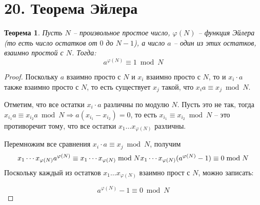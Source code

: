 \documentclass[a4paper,12pt]{article}
\newtheorem*{ther}{Теорема}
\renewcommand{\phi}{\varphi}
\begin{document}
        \section*{20. Теорема Эйлера}
        \begin{ther}
            Пусть $N$ -- произвольное простое число, $\phi(N)$ -- функция Эйлера
            (то есть число остатков от $0$ до $N-1$), а число $a$ -- один из этих
            остатков, взаимно простой с $N$. Тогда:
            $$
                a^{\phi(N)}\equiv 1 \bmod N
            $$
        \end{ther}
        \begin{proof}
            Поскольку $a$ взаимно просто с $N$ и $x_{i}$ взаимно просто с $N$, то и
            $x_{i}\cdot a$ также взаимно просто с $N$, то есть существует $x_j$
            такой, что $x_{i}a\equiv x_{j}\bmod N$.\par
            Отметим, что все остатки $x_i\cdot a$ различны по модулю $N$. Пусть это
            не так, тогда $x_{i_1}a\equiv x_{i_2}a \bmod N \Rightarrow
            a(x_{i_1}-x_{i_2}) = 0$, то есть $x_{i_1}\equiv x_{i_2} \bmod N$ -- это
            противоречит тому, что все остатки $x_1\ldots x_{\phi(N)}$ различны.
            \par Перемножим все сравнения $x_i\cdot a \equiv x_j\bmod N$, получим
            $$
                x_1 \cdots x_{\phi(N)} a^{\phi(N)} \equiv x_1 \cdots
                x_{\varphi(N)}\bmod N\\
                x_1 \cdots x_{\phi(N)} (a^{\phi(N)}-1) \equiv 0 \bmod N
            $$
            Поскольку каждый из остатков $x_1 \ldots x_{\phi(N)} $ взаимно
            прост с $N$, можно записать:

            $$
                a^{\phi(N)}-1 \equiv 0 \bmod N
            $$
        \end{proof}
\end{document}
